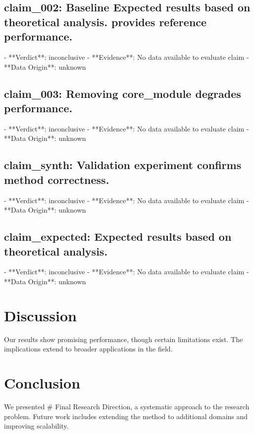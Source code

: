 \documentclass[11pt,a4paper]{article}
\begin{document}
\subsection{claim_002: Baseline Expected results based on theoretical analysis. provides reference performance.}
- **Verdict**: inconclusive
- **Evidence**: No data available to evaluate claim
- **Data Origin**: unknown

\subsection{claim_003: Removing core_module degrades performance.}
- **Verdict**: inconclusive
- **Evidence**: No data available to evaluate claim
- **Data Origin**: unknown

\subsection{claim_synth: Validation experiment confirms method correctness.}
- **Verdict**: inconclusive
- **Evidence**: No data available to evaluate claim
- **Data Origin**: unknown

\subsection{claim_expected: Expected results based on theoretical analysis.}
- **Verdict**: inconclusive
- **Evidence**: No data available to evaluate claim
- **Data Origin**: unknown


\section{Discussion}

Our results show promising performance, though certain limitations exist. The implications extend to broader applications in the field.

\section{Conclusion}

We presented # Final Research Direction, a systematic approach to the research problem. Future work includes extending the method to additional domains and improving scalability.
\end{document}
